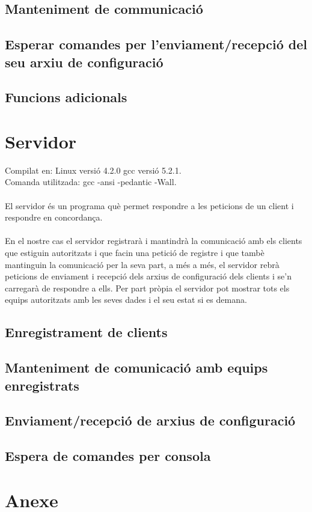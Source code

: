 \documentclass[11pt]{article}
\begin{document}
	\subsection{Manteniment de communicació}
	\subsection{Esperar comandes per l'enviament/recepció del seu arxiu de configuració}
	\subsection{Funcions adicionals}

\newpage
\section{Servidor}
Compilat en: Linux versió 4.2.0 gcc versió 5.2.1.\\
Comanda utilitzada: gcc -ansi -pedantic -Wall.
\\\\
El servidor és un programa què permet respondre a les peticions de un client i respondre en concordança.
\\\\
En el nostre cas el servidor registrarà i mantindrà la comunicació amb els clients que estiguin autoritzats i que facin una petició de registre i que tambè mantinguin la comunicació per la seva part, a més a més, el servidor rebrà peticions de enviament i recepció dels arxius de configuració dels clients i se'n carregarà de respondre a ells. Per part pròpia el servidor pot mostrar tots els equips autoritzats amb les seves dades i el seu estat si es demana.
	\subsection{Enregistrament de clients}
	\subsection{Manteniment de comunicació amb equips enregistrats }
	\subsection{Enviament/recepció de arxius de configuració}
	\subsection{Espera de comandes per consola}
\section{Anexe}
\end{document}
